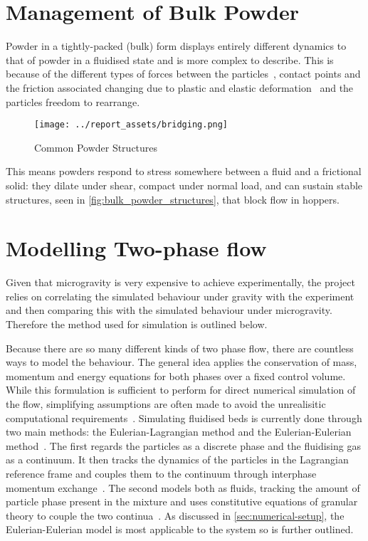 \section{Management of Bulk Powder}
Powder in a tightly-packed (bulk) form displays entirely different dynamics to that of powder in a fluidised state and is more complex to describe. This is because of the different types of forces between the particles~\cite{ZAFAR2017389}, contact points and the friction associated changing due to plastic and elastic deformation~\cite{TALEBI2024211} and the particles freedom to rearrange. 
\begin{figure}[htbp]
    \centering
    \begin{minipage}{0.5\textwidth}
        \centering
        \texttt{[image: ../report\_assets/bridging.png]}
        \caption{Common Powder Structures~\cite{911Metallurgist_binsflow}}\label{fig:bulk_powder_structures}
    \end{minipage}
\end{figure}
This means powders respond to stress somewhere between a fluid and a frictional solid: they dilate under shear, compact under normal load, and can sustain stable structures, seen in \autoref{fig:bulk_powder_structures}, that block flow in hoppers. 
\newpage
\section{Modelling Two-phase flow}
Given that microgravity is very expensive to achieve experimentally, the project relies on correlating the simulated behaviour under gravity with the experiment and then comparing this with the simulated behaviour under microgravity. Therefore the method used for simulation is outlined below.

Because there are so many different kinds of two phase flow, there are countless ways to model the behaviour.  The general idea applies the conservation of mass, momentum and energy equations for both phases over a fixed control volume. While this formulation is sufficient to perform for direct numerical simulation of the flow, simplifying assumptions are often made to avoid the unrealisitic computational requirements~\cite{enwald1996eulerian}. Simulating fluidised beds is currently done through two main methods: the Eulerian-Lagrangian method and the Eulerian-Eulerian method~\cite{C6RA28615A}. The first regards the particles as a discrete phase and the fluidising gas as a continuum. It then tracks the dynamics of the particles in the Lagrangian reference frame and couples them to the continuum through interphase momentum exchange~\cite{SUBRAMANIAM2013215}. The second models both as fluids, tracking the amount of particle phase present in the mixture and uses constitutive equations of granular theory to couple the two continua~\cite{C6RA28615A}. As discussed in \autoref{sec:numerical-setup}, the Eulerian-Eulerian model is most applicable to the system so is further outlined.


